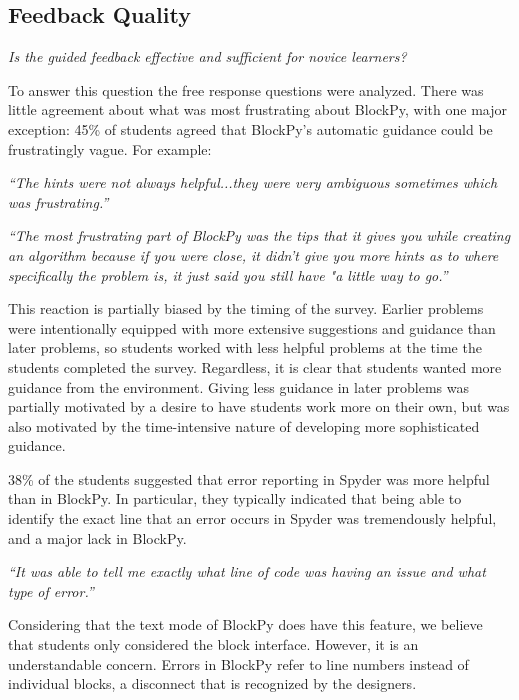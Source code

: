 \documentclass[10pt,journal,compsoc]{IEEEtran}
\begin{document}


\subsection{Feedback Quality}
\textit{Is the guided feedback effective and sufficient for novice learners?}

To answer this question the free response questions were analyzed.
There was little agreement about what was most frustrating about BlockPy, with one major exception: 45\% of students agreed that BlockPy's automatic guidance could be frustratingly vague.
For example:

\textit{``The hints were not always helpful...they were very ambiguous sometimes which was frustrating.''}

\textit{``The most frustrating part of BlockPy was the tips that it gives you while creating an algorithm because if you were close, it didn't give you more hints as to where specifically the problem is, it just said you still have "a little way to go.''}

This reaction is partially biased by the timing of the survey.
Earlier problems were intentionally equipped with more extensive suggestions and guidance than later problems, so students worked with less helpful problems at the time the students completed the survey.
Regardless, it is clear that students wanted more guidance from the environment.
Giving less guidance in later problems was partially motivated by a desire to have students work more on their own, but was also motivated by the time-intensive nature of developing more sophisticated guidance.

38\% of the students suggested that error reporting in Spyder was more helpful than in BlockPy.
In particular, they typically indicated that being able to identify the exact line that an error occurs in Spyder was tremendously helpful, and a major lack in BlockPy.

\textit{``It was able to tell me exactly what line of code was having an issue and what type of error.''}

Considering that the text mode of BlockPy does have this feature, we believe that students only considered the block interface.
However, it is an understandable concern.
Errors in BlockPy refer to line numbers instead of individual blocks, a disconnect that is recognized by the designers.
\end{document}
